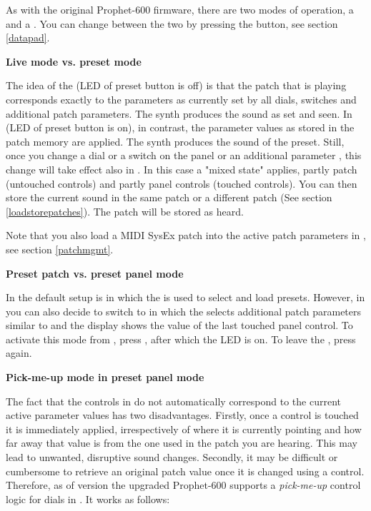 As with the original Prophet-600 firmware, there are two modes of operation, a \presetmode and a \livemode. You can change between the two by pressing the \preset button, see section \ref{datapad}. 

\textbf{Live mode vs. preset mode}

The idea of the \livemode (LED of preset button is off) is that the patch that is playing corresponds exactly to the parameters as currently set by all dials, switches and additional patch parameters. The synth produces the sound as set and seen. In \presetmode (LED of preset button is on), in contrast, the parameter values as stored in the patch memory are applied. The synth produces the sound of the preset. Still, once you change a dial or a switch on the panel or an additional parameter , this change will take effect also in \presetmode. In this case a "mixed state" applies, partly patch (untouched controls) and partly panel controls (touched controls). You can then store the current sound in the same patch or a different patch (See section \ref{loadstorepatches}). The patch will be stored as heard. 

Note that you also load a MIDI SysEx patch into the active patch parameters in \presetmode, see section \ref{patchmgmt}.

\textbf{Preset patch vs. preset panel mode}

In \presetmode the default setup is \presetpatch in which the \termnumberpad is used to select and load presets. However, in \presetmode you can also decide to switch to \presetpanel in which the \termnumberpad selects additional patch parameters similar to \livemode and the display shows the value of the last touched panel control. To activate this mode from \presetpatch, press \totape, after which the LED is on. To leave the \presetpanel, press \totape again. 

\textbf{Pick-me-up mode in preset panel mode}

The fact that the controls in \presetmode do not automatically correspond to the current active parameter values has two disadvantages. Firstly, once a control is touched it is immediately applied, irrespectively of where it is currently pointing and how far away that value is from the one used in the patch you are hearing. This may lead to unwanted, disruptive sound changes. Secondly, it may be difficult or cumbersome to retrieve an original patch value once it is changed using a control. Therefore, as of version \version the upgraded Prophet-600 supports a \textit{pick-me-up} control logic for dials in \presetpanel. It works as follows:

